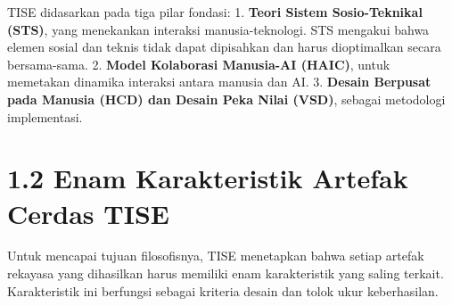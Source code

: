 \documentclass[
  letterpaper,
  DIV=11,
  numbers=noendperiod]{scrreprt}
\begin{document}
TISE didasarkan pada tiga pilar fondasi: 1. \textbf{Teori Sistem
Sosio-Teknikal (STS)}, yang menekankan interaksi manusia-teknologi. STS
mengakui bahwa elemen sosial dan teknis tidak dapat dipisahkan dan harus
dioptimalkan secara bersama-sama. 2. \textbf{Model Kolaborasi Manusia-AI
(HAIC)}, untuk memetakan dinamika interaksi antara manusia dan AI. 3.
\textbf{Desain Berpusat pada Manusia (HCD) dan Desain Peka Nilai (VSD)},
sebagai metodologi implementasi.

\section{\texorpdfstring{\textbf{1.2 Enam Karakteristik Artefak Cerdas
TISE}}{1.2 Enam Karakteristik Artefak Cerdas TISE}}\label{enam-karakteristik-artefak-cerdas-tise}

Untuk mencapai tujuan filosofisnya, TISE menetapkan bahwa setiap artefak
rekayasa yang dihasilkan harus memiliki enam karakteristik yang saling
terkait. Karakteristik ini berfungsi sebagai kriteria desain dan tolok
ukur keberhasilan.
\end{document}
